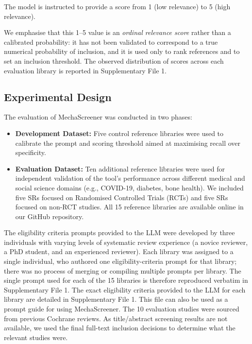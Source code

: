 \documentclass[11pt,a4paper]{article}
\begin{document}
The model is instructed to provide a score from 1 (low relevance) to 5 (high relevance).

We emphasise that this 1--5 value is an \emph{ordinal relevance score} rather than a calibrated probability: it has not been validated to correspond to a true numerical probability of inclusion, and it is used only to rank references and to set an inclusion threshold. The observed distribution of scores across each evaluation library is reported in Supplementary File 1.

\subsection{Experimental Design}
The evaluation of MechaScreener was conducted in two phases:
\begin{itemize}
    \item \textbf{Development Dataset:} Five control reference libraries were used to calibrate the prompt and scoring threshold aimed at maximising recall over specificity.
    \item \textbf{Evaluation Dataset:} Ten additional reference libraries were used for independent validation of the tool's performance across different medical and social science domains (e.g., COVID-19, diabetes, bone health). We included five SRs focused on Randomised Controlled Trials (RCTs) and five SRs focused on non-RCT studies. All 15 reference libraries are available online in our GitHub repository.
\end{itemize}

The eligibility criteria prompts provided to the LLM were developed by three individuals with varying levels of systematic review experience (a novice reviewer, a PhD student, and an experienced reviewer). Each library was assigned to a single individual, who authored one eligibility-criteria prompt for that library; there was no process of merging or compiling multiple prompts per library. The single prompt used for each of the 15 libraries is therefore reproduced verbatim in Supplementary File 1. The exact eligibility criteria provided to the LLM for each library are detailed in Supplementary File 1. This file can also be used as a prompt guide for using MechaScreener. The 10 evaluation studies were sourced from previous Cochrane reviews. As title/abstract screening results are not available, we used the final full-text inclusion decisions to determine what the relevant studies were.
\end{document}
